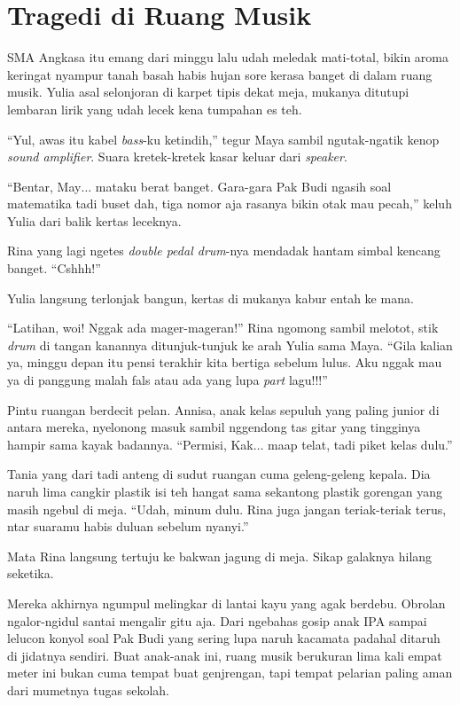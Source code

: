 \chapter*{Tragedi di Ruang Musik}

 SMA Angkasa itu emang dari minggu lalu udah meledak mati-total, bikin aroma keringat nyampur tanah basah habis hujan sore kerasa banget di dalam ruang musik. Yulia asal selonjoran di karpet tipis dekat meja, mukanya ditutupi lembaran lirik yang udah lecek kena tumpahan es teh.

``Yul, awas itu kabel \textit{bass}-ku ketindih,'' tegur Maya sambil ngutak-ngatik kenop \textit{sound amplifier}. Suara kretek-kretek kasar keluar dari \textit{speaker}.

``Bentar, May$\dots$ mataku berat banget. Gara-gara Pak Budi ngasih soal matematika tadi buset dah, tiga nomor aja rasanya bikin otak mau pecah,'' keluh Yulia dari balik kertas leceknya.

Rina yang lagi ngetes \textit{double pedal drum}-nya mendadak hantam simbal kencang banget. ``Cshhh!''

Yulia langsung terlonjak bangun, kertas di mukanya kabur entah ke mana.

``Latihan, woi! Nggak ada mager-mageran!'' Rina ngomong sambil melotot, stik \textit{drum} di tangan kanannya ditunjuk-tunjuk ke arah Yulia sama Maya. ``Gila kalian ya, minggu depan itu pensi terakhir kita bertiga sebelum lulus. Aku nggak mau ya di panggung malah fals atau ada yang lupa \textit{part} lagu!!!''

Pintu ruangan berdecit pelan. Annisa, anak kelas sepuluh yang paling junior di antara mereka, nyelonong masuk sambil nggendong tas gitar yang tingginya hampir sama kayak badannya. ``Permisi, Kak$\dots$ maap telat, tadi piket kelas dulu.''

Tania yang dari tadi anteng di sudut ruangan cuma geleng-geleng kepala. Dia naruh lima cangkir plastik isi teh hangat sama sekantong plastik gorengan yang masih ngebul di meja. ``Udah, minum dulu. Rina juga jangan teriak-teriak terus, ntar suaramu habis duluan sebelum nyanyi.''

Mata Rina langsung tertuju ke bakwan jagung di meja. Sikap galaknya hilang seketika.

Mereka akhirnya ngumpul melingkar di lantai kayu yang agak berdebu. Obrolan ngalor-ngidul santai mengalir gitu aja. Dari ngebahas gosip anak IPA sampai lelucon konyol soal Pak Budi yang sering lupa naruh kacamata padahal ditaruh di jidatnya sendiri. Buat anak-anak ini, ruang musik berukuran lima kali empat meter ini bukan cuma tempat buat genjrengan, tapi tempat pelarian paling aman dari mumetnya tugas sekolah.

